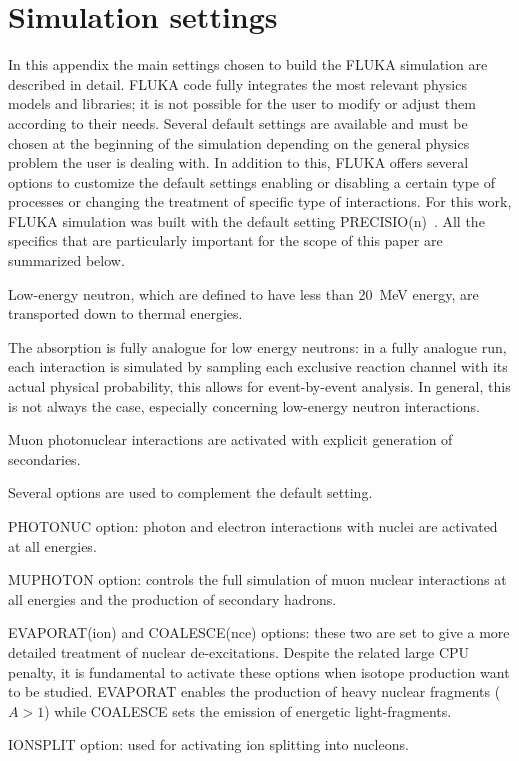 \section{Simulation settings}
\label{appendix_sim}
In this appendix  the main settings chosen to build the FLUKA simulation are described in detail. 
FLUKA code fully integrates the most relevant physics models and libraries; it is not possible for the user to modify or adjust them according to their needs. Several default settings are available and must be chosen at the beginning of the simulation depending on the general physics problem the user is dealing with. In addition to this, FLUKA offers several options to customize the default settings enabling or disabling a certain type of processes or changing the treatment of specific type of interactions. For this work, FLUKA simulation was built with the default setting PRECISIO(n)~\cite{fluka_manual}. All the specifics that are particularly important for the scope of this paper are summarized below.

Low-energy neutron, which are defined to have less than 20~MeV energy, are transported down to thermal energies.

The absorption is fully analogue for low energy neutrons: in a fully analogue run, each interaction is simulated by sampling each exclusive reaction channel with its actual physical probability, this allows for event-by-event analysis. In general, this is not always the case, especially concerning low-energy neutron interactions.

Muon photonuclear interactions are activated with explicit generation of secondaries.

Several options are used to complement the default setting.

PHOTONUC option: photon and electron interactions with nuclei are activated at all energies.
 
MUPHOTON option: controls the full simulation of muon nuclear interactions at all energies and the production of secondary hadrons.

EVAPORAT(ion) and COALESCE(nce) options: these two are set to give a more detailed treatment of nuclear de-excitations. Despite the related large CPU penalty, it is fundamental to activate these options when isotope production want to be studied. EVAPORAT enables the production of heavy nuclear fragments ($A>1$) while COALESCE sets the emission of energetic light-fragments. 

IONSPLIT option: used for activating ion splitting into nucleons.

